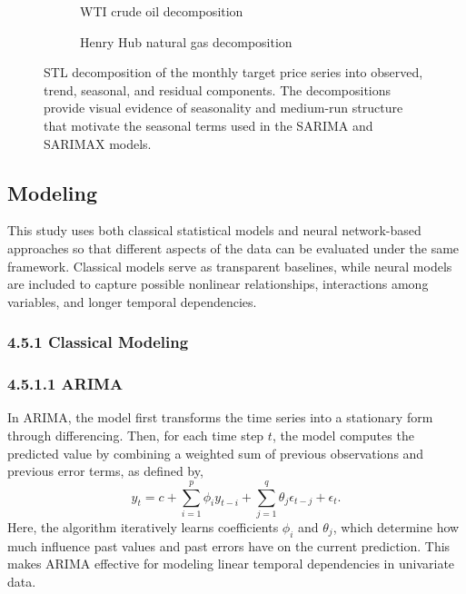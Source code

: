 \documentclass[pdflatex,sn-mathphys-num]{sn-jnl}%
\theoremstyle{thmstyleone}%
\theoremstyle{thmstyletwo}%
\theoremstyle{thmstylethree}%
\begin{document}
\begin{figure}[h]
\centering
\begin{subfigure}{0.49\textwidth}
    \centering
    
    \caption{WTI crude oil decomposition}
    \label{fig:stl_oil}
\end{subfigure}
\hfill
\begin{subfigure}{0.49\textwidth}
    \centering
    
    \caption{Henry Hub natural gas decomposition}
    \label{fig:stl_cng}
\end{subfigure}
\caption{STL decomposition of the monthly target price series into observed, trend, seasonal, and residual components. The decompositions provide visual evidence of seasonality and medium-run structure that motivate the seasonal terms used in the SARIMA and SARIMAX models.}
\label{fig:stl_decomposition}
\end{figure}

\subsection{Modeling}\label{subsec:modeling}

This study uses both classical statistical models and neural network-based approaches so that different aspects of the data can be evaluated under the same framework. Classical models serve as transparent baselines, while neural models are included to capture possible nonlinear relationships, interactions among variables, and longer temporal dependencies.

\subsubsection*{4.5.1 Classical Modeling}\label{subsubsec:classicalmodeling}

\subsubsection*{4.5.1.1 ARIMA}

In ARIMA, the model first transforms the time series into a stationary form through differencing. Then, for each time step $t$, the model computes the predicted value by combining a weighted sum of previous observations and previous error terms, as defined by,
\begin{equation}
 y_t = c + \sum_{i=1}^{p} \phi_i y_{t-i} + \sum_{j=1}^{q} \theta_j \epsilon_{t-j} + \epsilon_t.
\label{eq:arima}
\end{equation}
Here, the algorithm iteratively learns coefficients $\phi_i$ and $\theta_j$, which determine how much influence past values and past errors have on the current prediction. This makes ARIMA effective for modeling linear temporal dependencies in univariate data.
\end{document}

